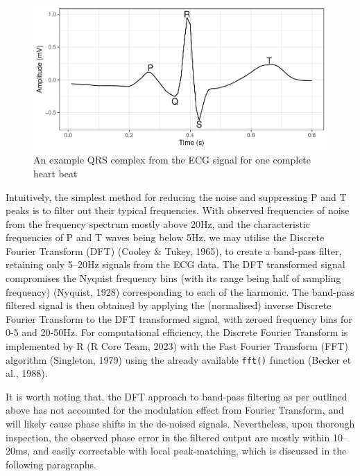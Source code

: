 \documentclass[
]{article}
\begin{document}
\begin{figure}

{\centering \includegraphics{report_files/figure-latex/qrs-1} 

}

\caption{An example QRS complex from the ECG signal for one complete heart beat}\label{fig:qrs}
\end{figure}

Intuitively, the simplest method for reducing the noise and suppressing
P and T peaks is to filter out their typical frequencies. With observed
frequencies of noise from the frequency spectrum mostly above 20Hz, and
the characteristic frequencies of P and T waves being below 5Hz, we may
utilise the Discrete Fourier Transform (DFT) (Cooley \& Tukey, 1965), to
create a band-pass filter, retaining only 5--20Hz signals from the ECG
data. The DFT transformed signal compromises the Nyquist frequency bins
(with its range being half of sampling frequency) (Nyquist, 1928)
corresponding to each of the harmonic. The band-pass filtered signal is
then obtained by applying the (normalised) inverse Discrete Fourier
Transform to the DFT transformed signal, with zeroed frequency bins for
0-5 and 20-50Hz. For computational efficiency, the Discrete Fourier
Transform is implemented by R (R Core Team, 2023) with the Fast Fourier
Transform (FFT) algorithm (Singleton, 1979) using the already available
\texttt{fft()} function (Becker et al., 1988).

It is worth noting that, the DFT approach to band-pass filtering as per
outlined above has not accounted for the modulation effect from Fourier
Transform, and will likely cause phase shifts in the de-noised signals.
Nevertheless, upon thorough inspection, the observed phase error in the
filtered output are mostly within 10--20ms, and easily correctable with
local peak-matching, which is discussed in the following paragraphs.
\end{document}
